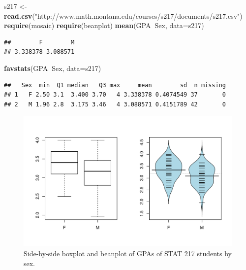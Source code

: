 \documentclass[]{book}
\newenvironment{Shaded}{\begin{snugshade}}{\end{snugshade}}
\newcommand{\KeywordTok}[1]{\textcolor[rgb]{0.13,0.29,0.53}{\textbf{#1}}}
\newcommand{\DataTypeTok}[1]{\textcolor[rgb]{0.13,0.29,0.53}{#1}}
\newcommand{\StringTok}[1]{\textcolor[rgb]{0.31,0.60,0.02}{#1}}
\newcommand{\OperatorTok}[1]{\textcolor[rgb]{0.81,0.36,0.00}{\textbf{#1}}}
\newcommand{\NormalTok}[1]{#1}
\theoremstyle{definition}
\theoremstyle{definition}
\theoremstyle{remark}
\begin{document}
\begin{Shaded}
\begin{Highlighting}[]
\NormalTok{s217 <-}\StringTok{ }\KeywordTok{read.csv}\NormalTok{(}\StringTok{"http://www.math.montana.edu/courses/s217/documents/s217.csv"}\NormalTok{)}
\KeywordTok{require}\NormalTok{(mosaic)}
\KeywordTok{require}\NormalTok{(beanplot)}
\KeywordTok{mean}\NormalTok{(GPA}\OperatorTok{~}\NormalTok{Sex, }\DataTypeTok{data=}\NormalTok{s217)}
\end{Highlighting}
\end{Shaded}

\begin{verbatim}
##        F        M 
## 3.338378 3.088571
\end{verbatim}

\begin{Shaded}
\begin{Highlighting}[]
\KeywordTok{favstats}\NormalTok{(GPA}\OperatorTok{~}\NormalTok{Sex, }\DataTypeTok{data=}\NormalTok{s217)}
\end{Highlighting}
\end{Shaded}

\begin{verbatim}
##   Sex  min  Q1 median   Q3 max     mean        sd  n missing
## 1   F 2.50 3.1  3.400 3.70   4 3.338378 0.4074549 37       0
## 2   M 1.96 2.8  3.175 3.46   4 3.088571 0.4151789 42       0
\end{verbatim}




\begin{figure}
\centering
\includegraphics{02-reintroductionToStatistics_files/figure-latex/Figure2-15-1.pdf}
\caption{\label{fig:Figure2-15}Side-by-side boxplot and beanplot of GPAs of STAT 217
students by sex.}
\end{figure}
\end{document}
